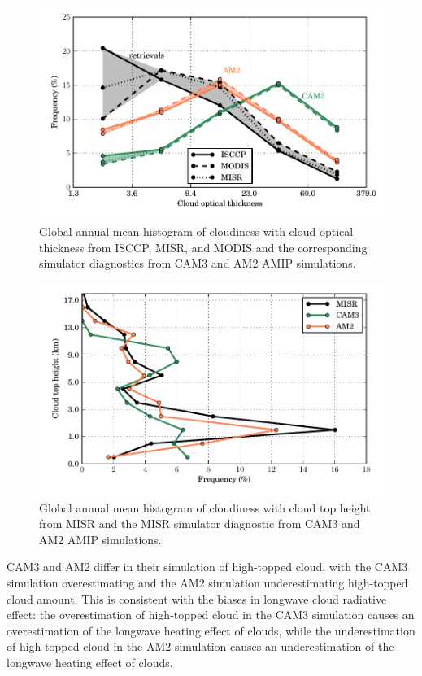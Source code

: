 \begin{figure}
    \centering
    \includegraphics{../graphics/tau_cmip3amip.pdf}
    \caption{Global annual mean histogram of cloudiness with cloud optical thickness from ISCCP, MISR, and MODIS and the corresponding simulator diagnostics from CAM3 and AM2 AMIP simulations.}
    \label{tau_cmip3amip}
\end{figure}

\begin{figure}
    \centering
    \includegraphics{../graphics/cth_cmip3amip.pdf}
    \caption{Global annual mean histogram of cloudiness with cloud top height from MISR and the MISR simulator diagnostic from CAM3 and AM2 AMIP simulations.}
    \label{cth_cmip3amip}
\end{figure}


CAM3 and AM2 differ in their simulation of high-topped cloud, with the CAM3 simulation overestimating and the AM2 simulation underestimating high-topped cloud amount. This is consistent with the biases in longwave cloud radiative effect: the overestimation of high-topped cloud in the CAM3 simulation causes an overestimation of the longwave heating effect of clouds, while the underestimation of high-topped cloud in the AM2 simulation causes an underestimation of the longwave heating effect of clouds.

